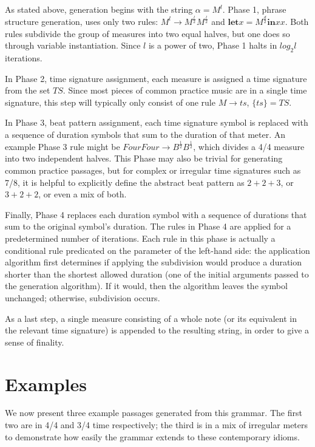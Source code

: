 \documentclass{article}
\begin{document}
As stated above, generation begins with the string $\alpha = M^l$. Phase 1, phrase structure generation, uses only two rules: $M^l \rightarrow M^\frac{l}{2} M^\frac{l}{2}$ and $\textbf{let} x = M^\frac{d}{2} \textbf{in} x x$. Both rules subdivide the group of measures into two equal halves, but one does so through variable instantiation. Since $l$ is a power of two, Phase 1 halts in $log_2 l$ iterations.

In Phase 2, time signature assignment, each measure is assigned a time signature from the set $TS$. Since most pieces of common practice music are in a single time signature, this step will typically only consist of one rule $M \rightarrow ts$, $\{ ts \} = TS$.

In Phase 3, beat pattern assignment, each time signature symbol is replaced with a sequence of duration symbols that sum to the duration of that meter. An example Phase 3 rule might be $FourFour \rightarrow B^\frac{1}{2} B^\frac{1}{2}$, which divides a 4/4 measure into two independent halves. This Phase may also be trivial for generating common practice passages, but for complex or irregular time signatures such as 7/8, it is helpful to explicitly define the abstract beat pattern as $2 + 2 + 3$, or $3 + 2 + 2$, or even a mix of both.

Finally, Phase 4 replaces each duration symbol with a sequence of durations that sum to the original symbol's duration. The rules in Phase 4 are applied for a predetermined number of iterations. Each rule in this phase is actually a conditional rule predicated on the parameter of the left-hand side: the application algorithm first determines if applying the subdivision would produce a duration shorter than the shortest allowed duration (one of the initial arguments passed to the generation algorithm). If it would, then the algorithm leaves the symbol unchanged; otherwise, subdivision occurs.

As a last step, a single measure consisting of a whole note (or its equivalent in the relevant time signature) is appended to the resulting string, in order to give a sense of finality.


\section{Examples}

We now present three example passages generated from this grammar. The first two are in 4/4 and 3/4 time respectively; the third is in a mix of irregular meters to demonstrate how easily the grammar extends to these contemporary idioms.
\end{document}

